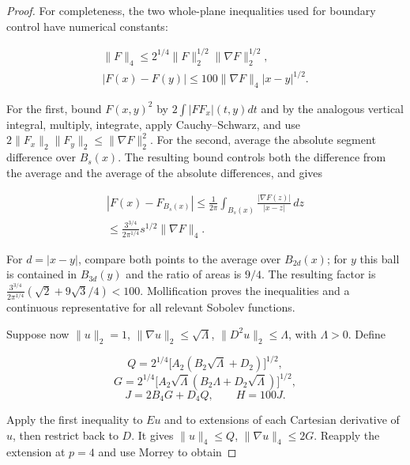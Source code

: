 \documentclass[11pt]{article}
\theoremstyle{definition}
\theoremstyle{remark}
\numberwithin{equation}{section}
\begin{document}
\begin{proof}
For completeness, the two whole-plane inequalities used for boundary control have numerical constants:

\begin{equation}\label{eq:src-2-07}
\begin{gathered}
\|F\|_4\le2^{1/4}\|F\|_2^{1/2}\|\nabla F\|_2^{1/2},\qquad \\
|F(x)-F(y)|\le100\|\nabla F\|_4|x-y|^{1/2}.
\end{gathered}
\end{equation}

For the first, bound $F(x,y)^2$ by $2\int|F F_x|(t,y)dt$ and by the analogous vertical integral, multiply, integrate, apply Cauchy--Schwarz, and use $2\|F_x\|_2\|F_y\|_2\le\|\nabla F\|_2^2$. For the second, average the absolute segment difference over $B_s(x)$. The resulting bound controls both the difference from the average and the average of the absolute differences, and gives

\begin{equation}\label{eq:src-2-08}
\begin{gathered}
|F(x)-F_{B_s(x)}|\le\frac1{2\pi}\int_{B_s(x)}\frac{|\nabla F(z)|}{|x-z|}\,dz \\
\le\frac{3^{3/4}}{2\pi^{1/4}}s^{1/2}\|\nabla F\|_4.
\end{gathered}
\end{equation}

For $d=|x-y|$, compare both points to the average over $B_{2d}(x)$; for $y$ this ball is contained in $B_{3d}(y)$ and the ratio of areas is $9/4$. The resulting factor is $\frac{3^{3/4}}{2\pi^{1/4}}(\sqrt2+9\sqrt3/4)<100$. Mollification proves the inequalities and a continuous representative for all relevant Sobolev functions.

Suppose now $\|u\|_2=1$, $\|\nabla u\|_2\le\sqrt\Lambda$, $\|D^2u\|_2\le\Lambda$, with $\Lambda>0$. Define

\begin{equation}\label{eq:src-2-09}
Q=2^{1/4}\big[A_2(B_2\sqrt\Lambda+D_2)\big]^{1/2},
\end{equation}
\begin{equation}\label{eq:src-2-10}
G=2^{1/4}\big[A_2\sqrt\Lambda(B_2\Lambda+D_2\sqrt\Lambda)\big]^{1/2},
\end{equation}
\begin{equation}\label{eq:src-2-11}
J=2B_4G+D_4Q,\qquad H=100J.
\end{equation}

Apply the first inequality to $Eu$ and to extensions of each Cartesian derivative of $u$, then restrict back to $D$. It gives $\|u\|_4\le Q$, $\|\nabla u\|_4\le2G$. Reapply the extension at $p=4$ and use Morrey to obtain


\end{proof}
\end{document}
